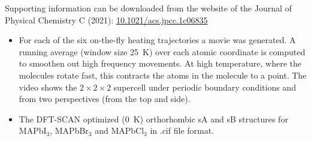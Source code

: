 \documentclass[journal=jpccck,manuscript=article,layout=twocolumn]{achemso}
\begin{document}
\begin{suppinfo}
Supporting information can be downloaded from the website of the Journal of Physical Chemistry C (2021): \href{https://doi.org/10.1021/acs.jpcc.1c06835}{10.1021/acs.jpcc.1c06835}
\begin{itemize}

\item For each of the six on-the-fly heating trajectories a movie was generated. A running average (window size 25~K) over each atomic coordinate is computed to smoothen out high frequency movements. At high temperature, where the molecules rotate fast, this contracts the atoms in the molecule to a point. The video shows the $2\times2\times2$ supercell under periodic boundary conditions and from two perspectives (from the top and side).

\item The DFT-SCAN optimized (0~K) orthorhombic sA and sB structures for MAPbI$_3$, MAPbBr$_3$ and MAPbCl$_3$ in .cif file format.
  
\end{itemize}
\end{suppinfo}
\end{document}
